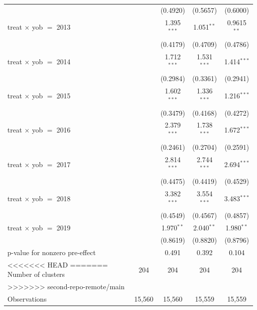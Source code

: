 \begin{table}[htbp]
\begin{tabular}{lcccc}
                                     &               & (0.4920)      & (0.5657)      & (0.6000)\\   
      treat $\times$ yob $=$ 2013    &               & 1.395$^{***}$ & 1.051$^{**}$  & 0.9615$^{**}$\\   
                                     &               & (0.4179)      & (0.4709)      & (0.4786)\\   
      treat $\times$ yob $=$ 2014    &               & 1.712$^{***}$ & 1.531$^{***}$ & 1.414$^{***}$\\   
                                     &               & (0.2984)      & (0.3361)      & (0.2941)\\   
      treat $\times$ yob $=$ 2015    &               & 1.602$^{***}$ & 1.336$^{***}$ & 1.216$^{***}$\\   
                                     &               & (0.3479)      & (0.4168)      & (0.4272)\\   
      treat $\times$ yob $=$ 2016    &               & 2.379$^{***}$ & 1.738$^{***}$ & 1.672$^{***}$\\   
                                     &               & (0.2461)      & (0.2704)      & (0.2591)\\   
      treat $\times$ yob $=$ 2017    &               & 2.814$^{***}$ & 2.744$^{***}$ & 2.694$^{***}$\\   
                                     &               & (0.4475)      & (0.4419)      & (0.4529)\\   
      treat $\times$ yob $=$ 2018    &               & 3.382$^{***}$ & 3.554$^{***}$ & 3.483$^{***}$\\   
                                     &               & (0.4549)      & (0.4567)      & (0.4857)\\   
      treat $\times$ yob $=$ 2019    &               & 1.970$^{**}$  & 2.040$^{**}$  & 1.980$^{**}$\\   
                                     &               & (0.8619)      & (0.8820)      & (0.8796)\\   
      p-value for nonzero pre-effect &               & 0.491         & 0.392         & 0.104\\  
<<<<<<< HEAD
=======
      Number of clusters             & 204           & 204           & 204           & 204\\  
>>>>>>> second-repo-remote/main
       \\
      Observations                   & 15,560        & 15,560        & 15,559        & 15,559\\  

\end{tabular}
\end{table}

